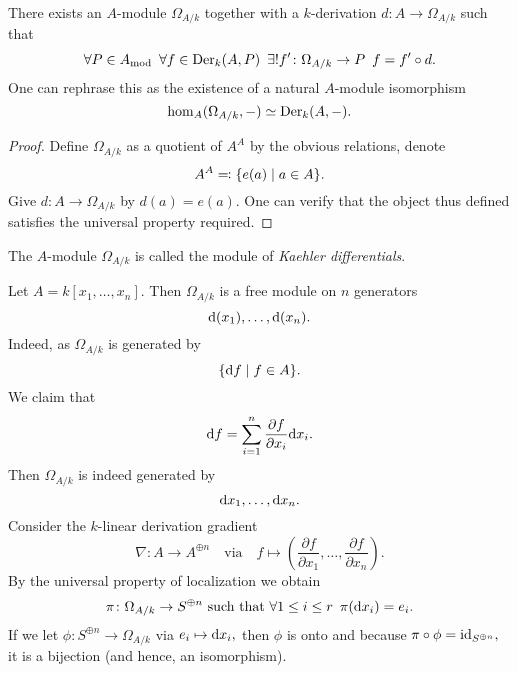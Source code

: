 \begin{theorem}
  \label{kaehler exists}
  There exists an $A$-module
  \( \Omega_{A / {k}}\)
  together with a \(k\)-derivation
  \(d \colon A \to \Omega_{A /{k}}\)
  such that
  \[ \forall P \in A_\text{mod} \enspace \forall f \in \operatorname{Der}_k(A, P) \enspace \exists \text{!} f' \colon \Omega_{A /{k}} \to P \enspace f = f' \circ d.\]
  One can rephrase this as the existence of a natural \(A\)-module isomorphism
  \[ \hom_A(\Omega_{A/{k}}, -) \simeq \operatorname{Der}_k(A, -).\]
\end{theorem}
\begin{proof}
  Define $\Omega_{A/{k}}$ as a quotient of $A^A$ by the obvious relations, denote
  \[ A^A \eqqcolon \{e(a) \mathrel{|} a \in A \}.\]
  Give $d \colon A \to \Omega_{A/{k}}$ by $d(a) = e(a)$.
  One can verify that the object thus defined satisfies the universal property required.
\end{proof}

\begin{df}
  The \(A\)-module \(\Omega_{A/{k}}\) is called the module of \emph{Kaehler differentials}.
\end{df}

\begin{example}
  Let $A = k[x_1, \dotsc, x_n]$. Then
  $\Omega_{A/{k}}$ is a free module on $n$ generators
  \[\text{d}(x_1), \dotsc, \text{d}(x_n).\]
  Indeed, as $\Omega_{A/{k}}$ is generated by
  \[ \{ \text{d} f \mathrel{|} f \in A\}.\]
  We claim that
  \[ \text{d} f = \sum_{i=1}^n \frac{\partial f}{\partial x_i} \text{d} x_i.\]
  Then $\Omega_{A /{k}}$ is indeed generated by
  \[ \text{d} x_1, \dotsc, \text{d} x_n.\]
  Consider the $k$-linear derivation gradient
  \[ \nabla \colon A \to A^{\oplus n} \quad \text{via} \quad f \mapsto ( \frac{\partial f}{\partial x_1}, \dotsc, \frac{\partial f}{\partial x_n}).\]
  By the universal property of localization we obtain
  \[ \pi \colon \Omega_{A /{k}} \to S^{\oplus n}\text{ such that } \forall 1 \leq i \leq r \enspace \pi(\text{d} x_i) = e_i.\]
  If we let
  \( \phi \colon S^{\oplus n} \to \Omega_{A /{k}}\)
  via
  \(e_i \mapsto \text{d} x_i,\)
  then $\phi$ is onto and because $\pi \circ \phi = \text{id}_{S^{\oplus n}},$ it is a bijection (and hence, an isomorphism).
\end{example}



